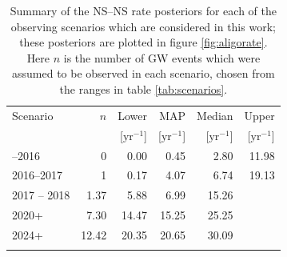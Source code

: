 \documentclass[twocolumn]{aastex61}
\newcommand{\yr}{\mathrm{yr}}
\newcommand{\BNS}{\ac{NS}--\ac{NS}\xspace}
\begin{document}
\begin{table}
\begin{center}
  \begin{tabular}{lrrrrr}
    \toprule
    Scenario &    $n$ & Lower       & MAP             & Median          & Upper\\
             &        & [$\yr^{-1}$] & [$\yr^{-1}$]    & [$\yr^{-1}$]    & [$\yr^{-1}$]  \\
    \colrule
    2015--2016 & 0   & 0.00	 & 0.45	 & 2.80	 & 11.98	\\
    2016--2017 & 1   & 0.17	 & 4.07	 & 6.74	 & 19.13	\\
    2017 -- 2018 & 1.37	 & 5.88	 & 6.99	 & 15.26 \\	
    2020+ & 7.30	 & 14.47	 & 15.25	 & 25.25	\\
    2024+ & 12.42	 & 20.35	 & 20.65	 & 30.09	\\
    \botrule
\end{tabular}
\end{center}

\caption{Summary of the \BNS rate posteriors for each of the observing
  scenarios which are considered in this work; these posteriors are plotted
  in figure \ref{fig:aligorate}. Here $n$ is the number of \ac{GW} events which were assumed to be observed in each scenario, chosen from the ranges in table \ref{tab:scenarios}.
  \label{tab:rateposteriors}
}
\end{table}
\end{document}
